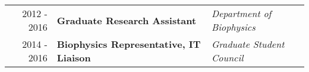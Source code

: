 \begin{minipage}{\textwidth}
\begin{center}
\begin{itemize}
		\end{itemize}
	\end{center}
\end{minipage}



\begin{minipage}{\textwidth}
	\begin{tabular}{r|ll}
		2012 - 2016 & \textbf{Graduate Research Assistant} & \textit{Department of Biophysics}  \\
		2014 - 2016 & \textbf{Biophysics Representative, IT Liaison} & \textit{Graduate Student Council}  \\
	\end{tabular}
\end{minipage}

